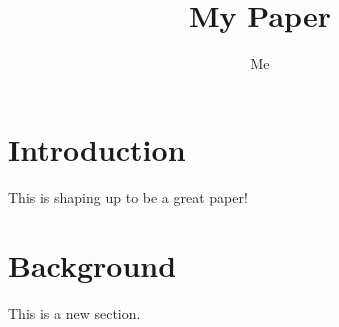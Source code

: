 \documentclass{article}
\title{My Paper}
\author{Me}
\begin{document}
\maketitle

\section{Introduction}

This is shaping up to be a great paper!

\section{Background}

This is a new section.
\end{document}
